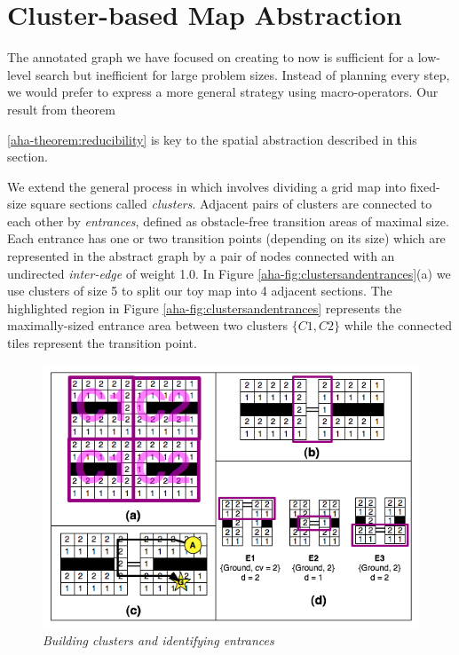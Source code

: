 \section{Cluster-based Map Abstraction}
\label{aha:mapabstraction}
The annotated graph we have focused on creating to now is sufficient for a low-level search but inefficient for large problem sizes. 
Instead of planning every step, we would prefer to express a more general strategy using macro-operators.
Our result from theorem {\ref{aha-theorem:reducibility} is key to the spatial abstraction described in this section. 
\par \indent
We extend the general process in \cite{botea04} which involves dividing a grid map into fixed-size square sections called \emph{clusters}. 
Adjacent pairs of clusters are connected to each other by \emph{entrances}, defined as obstacle-free transition areas of maximal size. 
Each entrance has one or two transition points (depending on its size) which are represented in the abstract graph by a pair of nodes connected with an undirected \emph{inter-edge} of weight 1.0. 
In Figure \ref{aha-fig:clustersandentrances}(a) we use clusters of size 5 to split our toy map into 4 adjacent sections. 
The highlighted region in Figure \ref{aha-fig:clustersandentrances} represents the maximally-sized entrance area between two clusters $\lbrace C1, C2 \rbrace$ while the connected tiles represent the transition point.
\begin{figure}[htbp]
        \caption{\emph{Building clusters and identifying entrances} }
        \begin{center}
                        \includegraphics[scale=0.40]{diagrams/identifying_entrances.png}

\end{center}
\end{figure}}
